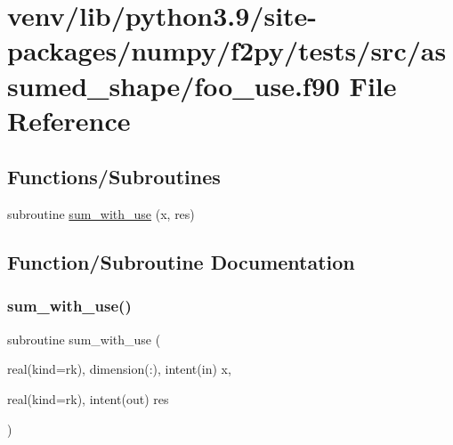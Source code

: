 \hypertarget{foo__use_8f90}{}\section{venv/lib/python3.9/site-\/packages/numpy/f2py/tests/src/assumed\+\_\+shape/foo\+\_\+use.f90 File Reference}
\label{foo__use_8f90}
\subsection*{Functions/\+Subroutines}
\begin{DoxyCompactItemize}
\item 
subroutine \hyperlink{foo__use_8f90_ae2a47648a50533c416d608dacea82f5a}{sum\+\_\+with\+\_\+use} (x, res)
\end{DoxyCompactItemize}


\subsection{Function/\+Subroutine Documentation}
\mbox{\label{foo__use_8f90_ae2a47648a50533c416d608dacea82f5a}} 
\subsubsection{\texorpdfstring{sum\+\_\+with\+\_\+use()}{sum\_with\_use()}}
{\footnotesize\ttfamily subroutine sum\+\_\+with\+\_\+use (\begin{DoxyParamCaption}\item[{real(kind=rk), dimension(\+:), intent(in)}]{x,  }\item[{real(kind=rk), intent(out)}]{res }\end{DoxyParamCaption})}

